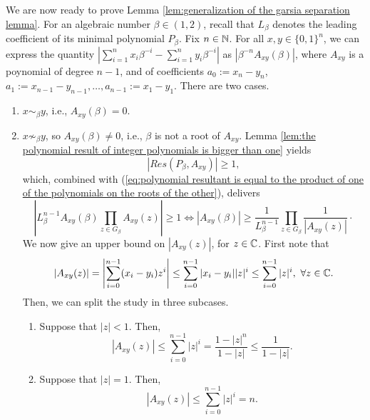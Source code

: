 We are now ready to prove Lemma \ref{lem:generalization of the garsia separation lemma}. For an algebraic number $\beta \in (1,2)$, recall that $L_\beta$ denotes the leading coefficient of its minimal polynomial $P_\beta$. Fix $n \in \mathbb{N}$. For all $x,y \in \{0,1\}^n$, we can express the quantity $\left|\sum_{i=1}^n x_i \beta^{-i} - \sum_{i=1}^n y_i \beta^{-i}\right|$ as $|\beta^{-n}A_{xy}(\beta)|$, where $A_{xy}$ is a poynomial of degree $n-1$, and of coefficients $a_0 := x_n - y_n$, $a_1 := x_{n-1} - y_{n-1}, \ldots, a_{n-1} := x_{1} - y_{1}$. There are two cases.
\begin{enumerate}[label=(\alph*)]
    \item $x \sim_\beta y$, i.e., $A_{xy}(\beta) = 0$.
    \item $x \not\sim_\beta y$, so $A_{xy}(\beta) \neq 0$, i.e., $\beta$ is not a root of $A_{xy}$. Lemma \ref{lem:the polynomial result of integer polynomials is bigger than one} yields
\begin{equation}
    |Res(P_\beta,A_{xy})| \geq 1,
\end{equation}
which, combined with (\ref{eq:polynomial resultant is equal to the product of one of the polynomials on the roots of the other}), delivers
\begin{equation}\label{eq:0:proof:lem:generalization of the garsia separation lemma}
    \left|L_\beta^{n-1} A_{xy}(\beta) \prod_{z \in G_\beta} A_{xy}(z)\right| \geq 1 \iff |A_{xy}(\beta)| \geq \frac{1}{L_\beta^{n-1}} \prod_{z \in G_\beta} \frac{1}{\left|A_{xy}(z)\right|} \cdot
\end{equation}
We now give an upper bound on $|A_{xy}(z)|$, for $z \in \mathbb{C}$. First note that
\begin{equation}
    |A_{xy}(z)| = \left|\sum_{i=0}^{n-1} (x_i - y_i) z^i \right| \leq \sum_{i=0}^{n-1} |x_i-y_i| |z|^i \leq \sum_{i=0}^{n-1} |z|^i, \ \forall z \in \mathbb{C}.
\end{equation}
Then, we can split the study in three subcases.
\begin{enumerate}[label=(\roman*)]
    \item Suppose that $|z| < 1$. Then,
    \begin{equation}
        |A_{xy}(z)| \leq \sum_{i=0}^{n-1} |z|^i = \frac{1 - |z|^n}{1 - |z|} \leq \frac{1}{1 - |z|}.
    \end{equation}
    \item Suppose that $|z| = 1$. Then,
    \begin{equation}
        |A_{xy}(z)| \leq \sum_{i=0}^{n-1} |z|^i = n.
    \end{equation}

\end{enumerate}
\end{enumerate}
